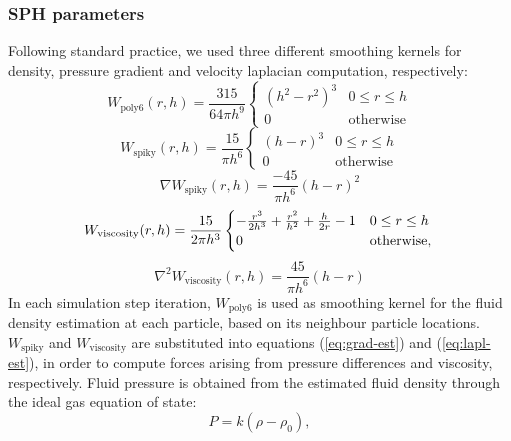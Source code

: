 \documentclass{llncs}
\begin{document}
\subsubsection{SPH parameters} Following standard practice, we used three different
smoothing kernels for density, pressure gradient and velocity laplacian computation,
respectively:
\begin{equation}
  \label{eq:poly6}
  W_{\text{poly6}}(r, h) = \frac{315}{64 \pi h^9}
  \begin{cases}
    (h^2 - r^2)^3 & 0 \leq r \leq h\\
    0 & \text{otherwise}
  \end{cases}
\end{equation}
\begin{equation}
  \label{eq:spiky}
  W_{\text{spiky}}(r, h) = \frac{15}{\pi h^6}
  \begin{cases}
    (h - r)^3 & 0 \leq r \leq h\\
    0 & \text{otherwise}
  \end{cases}
\end{equation}
\begin{equation*}
  \label{eq:spiky-gradient}
  \nabla W_{\text{spiky}}(r, h) = \frac{-45}{\pi h^6} (h-r)^2
\end{equation*}
\begin{equation}
  \label{eq:viscosity}
  W_{\text{viscosity}}(r, h) = \frac{15}{2 \pi h^3}
  \begin{cases}
    - \frac{r^3}{2h^3} + \frac{r^2}{h^2} + \frac{h}{2r} - 1 & 0 \leq r \leq h\\
    0 & \text{otherwise},
  \end{cases}\\
\end{equation}
\begin{equation*}
  \label{eq:viscosity-laplacian}
  \nabla^2 W_{\text{viscosity}}(r, h) = \frac{45}{\pi h^6} (h-r)
\end{equation*}
In each simulation step iteration, $W_{\text{poly6}}$ is used as smoothing kernel for the
fluid density estimation at each particle, based on its neighbour particle
locations. $W_{\text{spiky}}$ and $W_{\text{viscosity}}$ are substituted into equations
(\ref{eq:grad-est}) and (\ref{eq:lapl-est}), in order to compute forces arising from
pressure differences and viscosity, respectively. Fluid pressure is obtained from the
estimated fluid density through the ideal gas equation of state:
\begin{equation}
  \label{eq:ideal-state}
  P = k(\rho - \rho_0),
\end{equation}
\end{document}
